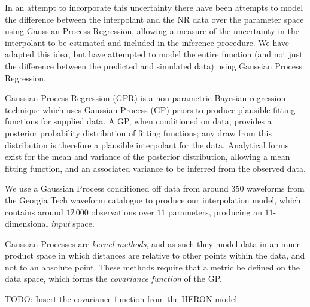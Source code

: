 \documentclass{kentigern}
\theoremstyle{definition}
\begin{document}
In an attempt to incorporate this uncertainty there have been attempts
to model the difference between the interpolant and the NR data over
the parameter space\cite{2014PhRvL.113y1101M,2016PhRvD..93f4001M}
using Gaussian Process Regression, allowing a measure of the
uncertainty in the interpolant to be estimated and included in the
inference procedure. We have adapted this idea, but have attempted to
model the entire function (and not just the difference between the
predicted and simulated data) using Gaussian Process Regression.

Gaussian Process Regression (GPR) is a non-parametric Bayesian
regression technique which uses Gaussian Process (GP) priors to
produce plausible fitting functions for supplied data. A GP, when
conditioned on data, provides a posterior probability distribution of
fitting functions; any draw from this distribution is therefore a
plausible interpolant for the data. Analytical forms exist for the
mean and variance of the posterior distribution, allowing a mean
fitting function, and an associated variance to be inferred from the
observed data.

We use a Gaussian Process conditioned off data from around 350
waveforms from the Georgia Tech waveform catalogue to produce our
interpolation model, which contains around $12\,000$ observations over
$11$ parameters, producing an $11$-dimensional \emph{input} space.

Gaussian Processes are \emph{kernel methods}, and as such they model
data in an inner product space in which distances are relative to
other points within the data, and not to an absolute point. These
methods require that a metric be defined on the data space, which
forms the \emph{covariance function} of the GP.

TODO: Insert the covariance function from the HERON model
\end{document}

